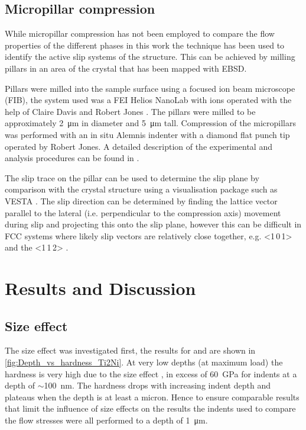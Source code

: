 
\subsection{Micropillar compression}

While micropillar compression has not been employed to compare the flow properties of the different phases in this work the technique has been used to identify the active slip systems of the  structure. This can be achieved by milling pillars in an area of the crystal that has been mapped with EBSD. 

Pillars were milled into the sample surface using a focused ion beam microscope (FIB), the system used was a FEI Helios NanoLab with  ions operated with the help of Claire Davis \cite{Davis2015} and Robert Jones \cite{Jones2016}. The pillars were milled to be approximately \SI{2}{\micro\meter} in diameter and \SI{5}{\micro\meter} tall. Compression of the micropillars was performed with an in situ Alemnis indenter with a diamond flat punch tip operated by Robert Jones. A detailed description of the experimental and analysis procedures can be found in \cite{Davis2015}.

The slip trace on the pillar can be used to determine the slip plane by comparison with the crystal structure using a visualisation package such as VESTA \cite{Momma2011,Davis2015}. The slip direction can be determined by finding the lattice vector parallel to the lateral (i.e. perpendicular to the compression axis) movement during slip and projecting this onto the slip plane, however this can be difficult in FCC systems where likely slip vectors are relatively close together, e.g. <1\,0\,1> and the <1\,1\,2> \cite{Davis2015}.


\section{Results and Discussion}


\subsection{Size effect}


The size effect was investigated first, the results for  and  are shown in \autoref{fig:Depth_vs_hardness_Ti2Ni}. At very low depths (at maximum load) the hardness is very high due to the size effect \cite{Cripps2011}, in excess of \SI{60}{\giga\pascal} for indents at a depth of $\sim$\SI{100}{\nano\meter}. The hardness drops with increasing indent depth and plateaus when the depth is at least a micron. Hence to ensure comparable results that limit the influence of size effects on the results the indents used to compare the flow stresses were all performed to a depth of \SI{1}{\micro\meter}. 

